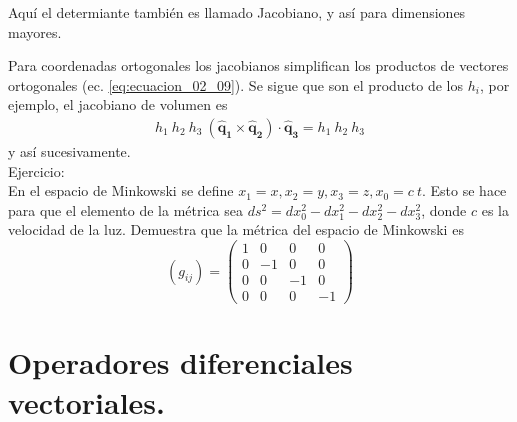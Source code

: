 Aquí el determiante también es llamado Jacobiano, y así para dimensiones mayores.
\par
Para coordenadas ortogonales los jacobianos simplifican los productos de vectores ortogonales (ec. \ref{eq:ecuacion_02_09}). Se sigue que son el producto de los $h_{i}$, por ejemplo, el jacobiano de volumen es
\begin{align*}
h_{1} \: h_{2} \: h_{3} \: (\mathbf{\widehat{q}_{1}} \times \mathbf{\widehat{q}_{2}} ) \cdot \mathbf{\widehat{q}_{3}} = h_{1} \: h_{2} \: h_{3}
\end{align*}
y así sucesivamente.
\\
Ejercicio:
\\
En el espacio de Minkowski se define $x_{1} = x, x_{2} = y, x_{3} = z, x_{0} = c \: t$. Esto se hace para que el elemento de la métrica sea $ds^{2} = dx_{0}^{2} - dx_{1}^{2} - dx_{2}^{2} - dx_{3}^{2}$, donde $c$ es la velocidad de la luz. Demuestra que la métrica del espacio de Minkowski es
\[ (g_{ij}) = \begin{pmatrix}
1 & 0 & 0 & 0 \\
0 & -1 & 0 & 0 \\
0 & 0 & -1 & 0 \\
0 & 0 & 0 & -1
\end{pmatrix} \] 
\section{Operadores diferenciales vectoriales.}
